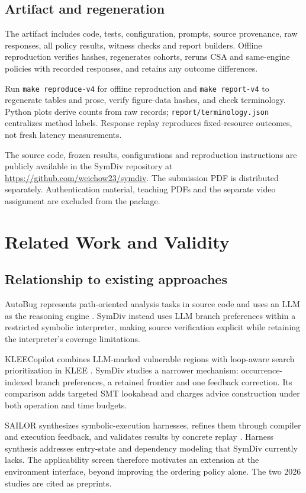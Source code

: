 \documentclass[sigconf]{acmart}
\begin{document}
\subsection{Artifact and regeneration}
The artifact includes code, tests, configuration, prompts, source provenance,
raw responses, all policy results, witness checks and report builders. Offline
reproduction verifies hashes, regenerates cohorts, reruns CSA and same-engine
policies with recorded responses, and retains any outcome differences.
\VFourReproduction{}

Run \texttt{make reproduce-v4} for offline reproduction and
\texttt{make report-v4} to regenerate tables and prose, verify figure-data
hashes, and check terminology. Python plots derive counts from raw records;
\texttt{report/terminology.json} centralizes method labels. Response replay
reproduces fixed-resource outcomes, not fresh latency measurements.

The source code, frozen results, configurations and reproduction instructions
are publicly available in the SymDiv repository at
\url{https://github.com/weichow23/symdiv}. The submission PDF is distributed
separately. Authentication material, teaching PDFs and the separate video
assignment are excluded from the package.

\section{Related Work and Validity}
\subsection{Relationship to existing approaches}
AutoBug represents path-oriented analysis tasks in source code and uses an
LLM as the reasoning engine \cite{autobug}. SymDiv instead uses LLM branch
preferences within a restricted symbolic interpreter, making source
verification explicit while retaining the interpreter's coverage limitations.

KLEECopilot combines LLM-marked vulnerable regions with loop-aware search
prioritization in KLEE \cite{kleecopilot}. SymDiv studies a narrower mechanism:
occurrence-indexed branch preferences, a retained frontier and one feedback
correction. Its comparison adds targeted SMT lookahead and charges advice
construction under both operation and time budgets.

SAILOR synthesizes symbolic-execution harnesses, refines them through compiler
and execution feedback, and validates results by concrete replay \cite{sailor}.
Harness synthesis addresses entry-state and dependency modeling that SymDiv
currently lacks. The applicability screen therefore motivates an extension
at the environment interface, beyond improving the ordering policy alone.
The two 2026 studies are cited as preprints.
\end{document}
